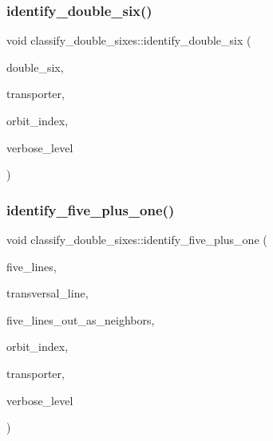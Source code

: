 \subsubsection{\texorpdfstring{identify\+\_\+double\+\_\+six()}{identify\_double\_six()}}
{\footnotesize\ttfamily void classify\+\_\+double\+\_\+sixes\+::identify\+\_\+double\+\_\+six (\begin{DoxyParamCaption}\item[{\mbox{\hyperlink{galois_8h_a09fddde158a3a20bd2dcadb609de11dc}{I\+NT}} $\ast$}]{double\+\_\+six,  }\item[{\mbox{\hyperlink{galois_8h_a09fddde158a3a20bd2dcadb609de11dc}{I\+NT}} $\ast$}]{transporter,  }\item[{\mbox{\hyperlink{galois_8h_a09fddde158a3a20bd2dcadb609de11dc}{I\+NT}} \&}]{orbit\+\_\+index,  }\item[{\mbox{\hyperlink{galois_8h_a09fddde158a3a20bd2dcadb609de11dc}{I\+NT}}}]{verbose\+\_\+level }\end{DoxyParamCaption})}

\mbox{\label{classclassify__double__sixes_aa78728c03ff9c37c26413c3d1ebac85a}} 
\subsubsection{\texorpdfstring{identify\+\_\+five\+\_\+plus\+\_\+one()}{identify\_five\_plus\_one()}}
{\footnotesize\ttfamily void classify\+\_\+double\+\_\+sixes\+::identify\+\_\+five\+\_\+plus\+\_\+one (\begin{DoxyParamCaption}\item[{\mbox{\hyperlink{galois_8h_a09fddde158a3a20bd2dcadb609de11dc}{I\+NT}} $\ast$}]{five\+\_\+lines,  }\item[{\mbox{\hyperlink{galois_8h_a09fddde158a3a20bd2dcadb609de11dc}{I\+NT}}}]{transversal\+\_\+line,  }\item[{\mbox{\hyperlink{galois_8h_a09fddde158a3a20bd2dcadb609de11dc}{I\+NT}} $\ast$}]{five\+\_\+lines\+\_\+out\+\_\+as\+\_\+neighbors,  }\item[{\mbox{\hyperlink{galois_8h_a09fddde158a3a20bd2dcadb609de11dc}{I\+NT}} \&}]{orbit\+\_\+index,  }\item[{\mbox{\hyperlink{galois_8h_a09fddde158a3a20bd2dcadb609de11dc}{I\+NT}} $\ast$}]{transporter,  }\item[{\mbox{\hyperlink{galois_8h_a09fddde158a3a20bd2dcadb609de11dc}{I\+NT}}}]{verbose\+\_\+level }\end{DoxyParamCaption})}

